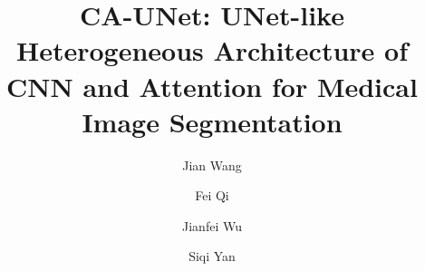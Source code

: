 \documentclass[runningheads]{llncs}
\begin{document}
%
\title{CA-UNet: UNet-like Heterogeneous Architecture of CNN and Attention for Medical Image Segmentation
}
%
%
\author{Jian Wang \and
Fei Qi \and
Jianfei Wu  \and
Siqi Yan
}

%
%

%


%
\maketitle              %
%
\end{document}
